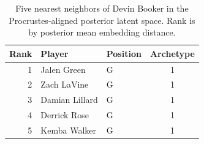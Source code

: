 \begin{table}[htbp]
  \centering\small
  \begin{tabular}{rllc}
    \toprule
    Rank & Player & Position & Archetype \\
    \midrule
    1 & Jalen Green & G & 1 \\
    2 & Zach LaVine & G & 1 \\
    3 & Damian Lillard & G & 1 \\
    4 & Derrick Rose & G & 1 \\
    5 & Kemba Walker & G & 1 \\
    \bottomrule
  \end{tabular}
  \caption{Five nearest neighbors of Devin Booker in the Procrustes-aligned posterior latent space. Rank is by posterior mean embedding distance.}
  \label{tab:Devin_Booker_neighbors}
\end{table}

